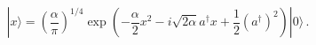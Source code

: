 \begin{equation}
| x \rangle = \left( \frac{\alpha}{ \pi}  \right)^{1/4}
\exp\left(-\frac{\alpha}{ 2}x^2
-i \sqrt{2 \alpha} a^{\dagger} x +\frac{1}{2} (a^{\dagger})^2 \right)
| 0 \rangle\,. 
\end{equation}

